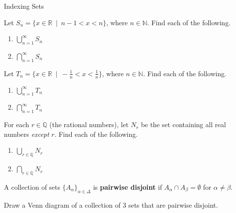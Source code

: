 \begin{section}{Indexing Sets}
\begin{problem}
Let $S_n = \{x \in \mathbb{R} \ \mid  \ n-1<x<n \}$, where $n\in \mathbb{N}$.  Find each of the following.
\begin{multicols}{2}
\begin{enumerate}[label=\textrm{(\alph*)}]
\item $\displaystyle \bigcup_{n=1}^{\infty}S_n$
\item $\displaystyle \bigcap_{n=1}^{\infty}S_n$
\end{enumerate}
\end{multicols}
\end{problem}

\begin{problem}
Let $T_n = \{x \in \mathbb{R} \ \mid  \ -\frac{1}{n}<x< \frac{1}{n} \}$, where $n\in \mathbb{N}$.  Find each of the following.
\begin{multicols}{2}
\begin{enumerate}[label=\textrm{(\alph*)}]
\item $\displaystyle \bigcup_{n=1}^{\infty}T_n$
\item $\displaystyle \bigcap_{n=1}^{\infty}T_n$
\end{enumerate}
\end{multicols}
\end{problem}

\begin{problem}
For each $r\in\mathbb{Q}$ (the rational numbers), let $N_r$ be the set containing all real numbers \emph{except} $r$.  Find each of the following.
\begin{multicols}{2}
\begin{enumerate}[label=\textrm{(\alph*)}]
\item $\displaystyle \bigcup_{r\in\mathbb{Q}}N_r$
\item $\displaystyle \bigcap_{r\in\mathbb{Q}}N_r$
\end{enumerate}
\end{multicols}
\end{problem}

\begin{definition}
A collection of sets $\{A_{\alpha}\}_{\alpha\in\Delta}$ is \textbf{pairwise disjoint} if $A_{\alpha} \cap A_{\beta}=\emptyset$ for $\alpha\neq \beta$.
\end{definition}

\begin{problem}
Draw a Venn diagram of a collection of 3 sets that are pairwise disjoint.
\end{problem}


\end{section}
